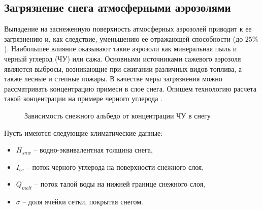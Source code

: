 \documentclass[a4paper, fontsize=14pt]{scrartcl}
\begin{document}
\subsection{Загрязнение снега атмосферными аэрозолями}

Выпадение на заснеженную поверхность атмосферных аэрозолей приводит к ее загрязнению и, как следствие, уменьшению ее отражающей способности (до $25 \%$). Наибольшее влияние оказывают такие аэрозоли как минеральная пыль и черный углерод (ЧУ) или сажа. Основными источниками сажевого аэрозоля являются выбросы, возникающие при сжигании различных видов топлива, а также лесные и степные пожары. В качестве меры загрязнения можно рассматривать концентрацию примеси в слое снега. Опишем технологию расчета такой концентрации на примере черного углерода \cite{Chernenkov2021rus}.



\begin{figure}[h]
    \caption{Зависимость снежного альбедо от концентрации ЧУ в снегу}
    \label{fig:image}
\end{figure}

\newpage
Пусть имеются следующие климатические данные:
\begin{itemize}
    \item $H_{snw}$ -- водно-эквивалентная толщина снега, 
    \item $I_{bc}$ -- поток черного углерода на поверхности снежного слоя, 
    \item $Q_{melt}$ -- поток талой воды на нижней границе снежного слоя,
    \item $\sigma$ -- доля ячейки сетки, покрытая снегом.
\end{itemize}
 ~
\end{document}
